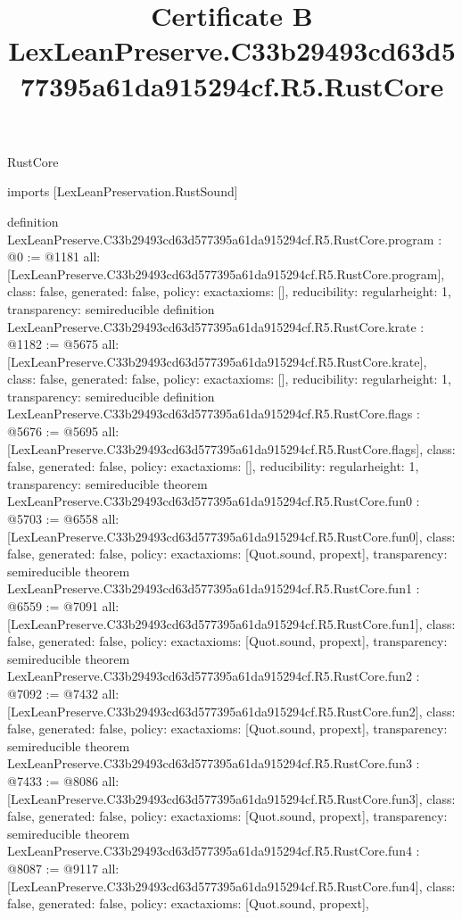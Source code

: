 \begin{lexlean}{RustCore}
\title{Certificate B LexLeanPreserve.C33b29493cd63d577395a61da915294cf.R5.RustCore}
\begin{coremodule}
imports [LexLeanPreservation.RustSound]

definition LexLeanPreserve.C33b29493cd63d577395a61da915294cf.R5.RustCore.program : @0 := @1181 {
  all: [LexLeanPreserve.C33b29493cd63d577395a61da915294cf.R5.RustCore.program],
  class: false,
  generated: false,
  policy: exact{axioms: []},
  reducibility: regular{height: 1},
  transparency: semireducible
}
definition LexLeanPreserve.C33b29493cd63d577395a61da915294cf.R5.RustCore.krate : @1182 := @5675 {
  all: [LexLeanPreserve.C33b29493cd63d577395a61da915294cf.R5.RustCore.krate],
  class: false,
  generated: false,
  policy: exact{axioms: []},
  reducibility: regular{height: 1},
  transparency: semireducible
}
definition LexLeanPreserve.C33b29493cd63d577395a61da915294cf.R5.RustCore.flags : @5676 := @5695 {
  all: [LexLeanPreserve.C33b29493cd63d577395a61da915294cf.R5.RustCore.flags],
  class: false,
  generated: false,
  policy: exact{axioms: []},
  reducibility: regular{height: 1},
  transparency: semireducible
}
theorem LexLeanPreserve.C33b29493cd63d577395a61da915294cf.R5.RustCore.fun0 : @5703 := @6558 {
  all: [LexLeanPreserve.C33b29493cd63d577395a61da915294cf.R5.RustCore.fun0],
  class: false,
  generated: false,
  policy: exact{axioms: [Quot.sound, propext]},
  transparency: semireducible
}
theorem LexLeanPreserve.C33b29493cd63d577395a61da915294cf.R5.RustCore.fun1 : @6559 := @7091 {
  all: [LexLeanPreserve.C33b29493cd63d577395a61da915294cf.R5.RustCore.fun1],
  class: false,
  generated: false,
  policy: exact{axioms: [Quot.sound, propext]},
  transparency: semireducible
}
theorem LexLeanPreserve.C33b29493cd63d577395a61da915294cf.R5.RustCore.fun2 : @7092 := @7432 {
  all: [LexLeanPreserve.C33b29493cd63d577395a61da915294cf.R5.RustCore.fun2],
  class: false,
  generated: false,
  policy: exact{axioms: [Quot.sound, propext]},
  transparency: semireducible
}
theorem LexLeanPreserve.C33b29493cd63d577395a61da915294cf.R5.RustCore.fun3 : @7433 := @8086 {
  all: [LexLeanPreserve.C33b29493cd63d577395a61da915294cf.R5.RustCore.fun3],
  class: false,
  generated: false,
  policy: exact{axioms: [Quot.sound, propext]},
  transparency: semireducible
}
theorem LexLeanPreserve.C33b29493cd63d577395a61da915294cf.R5.RustCore.fun4 : @8087 := @9117 {
  all: [LexLeanPreserve.C33b29493cd63d577395a61da915294cf.R5.RustCore.fun4],
  class: false,
  generated: false,
  policy: exact{axioms: [Quot.sound, propext]},
}
\end{coremodule}
\end{lexlean}
